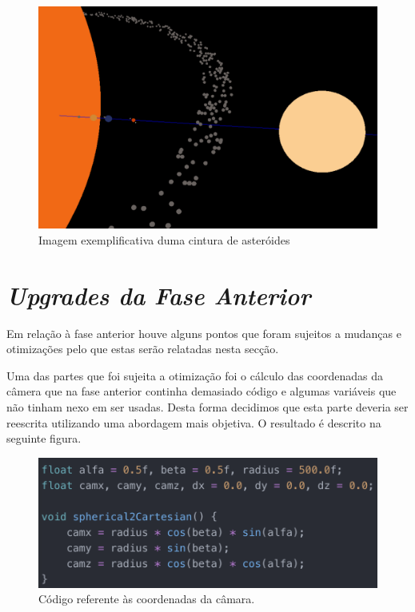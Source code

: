 \documentclass[a4paper]{article}
\begin{document}
    
\begin{figure}[H]
\centering
\includegraphics[scale=0.45]{cintura.png}
\caption{Imagem exemplificativa duma cintura de asteróides}
\label{img:cintura}
\end{figure}
   


\newpage

\section{\textit{Upgrades da Fase Anterior}}

Em relação à fase anterior houve alguns pontos que foram sujeitos a mudanças e otimizações pelo que estas serão relatadas nesta secção.

Uma das partes que foi sujeita a otimização foi o cálculo das coordenadas da câmera que na fase anterior continha demasiado código e algumas variáveis que não tinham nexo em ser usadas.
Desta forma decidimos que esta parte deveria ser reescrita utilizando uma abordagem mais objetiva. O resultado é descrito na seguinte figura.

\begin{figure}[H]
\centering
\includegraphics[scale=0.9]{camara.png}
\caption{Código referente às coordenadas da câmara.}
\label{img:camara}
\end{figure}
\end{document}
